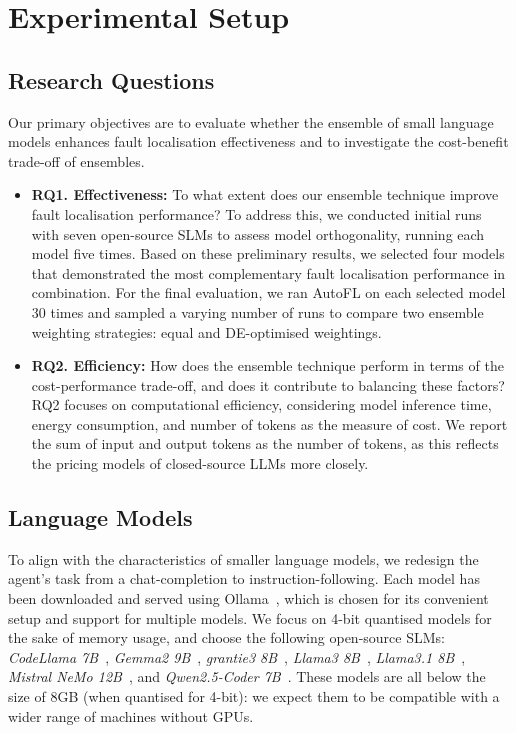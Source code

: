 \section{Experimental Setup}
\label{sec:experimentalsetup}

\subsection{Research Questions}
Our primary objectives are to evaluate whether the ensemble of small language models enhances fault localisation effectiveness and to investigate the cost-benefit trade-off of ensembles.

\begin{itemize}
    \item \textbf{RQ1. Effectiveness:} To what extent does our ensemble technique improve fault localisation performance? To address this, we conducted initial runs with seven open-source SLMs to assess model orthogonality, running each model five times. Based on these preliminary results, we selected four models that demonstrated the most complementary fault localisation performance in combination. For the final evaluation, we ran AutoFL on each selected model 30 times and sampled a varying number of runs to compare two ensemble weighting strategies: equal and DE-optimised weightings.
    
    \item \textbf{RQ2. Efficiency:} How does the ensemble technique perform in terms of the cost-performance trade-off, and does it contribute to balancing these factors? RQ2 focuses on computational efficiency, considering model inference time, energy consumption, and number of tokens as the measure of cost. We report the sum of input and output tokens as the number of tokens, as this reflects the pricing models of closed-source LLMs more closely.
\end{itemize}

\subsection{Language Models}

To align with the characteristics of smaller language models, we redesign the agent's task from a chat-completion to instruction-following. Each model has been downloaded and served using Ollama~\cite{Ollama2024}, which is chosen for its convenient setup and support for multiple models. We focus on 4-bit quantised models for the sake of memory usage, and choose the following open-source SLMs: \emph{CodeLlama 7B}~\cite{roziereCodeLlamaOpen2024}, \emph{Gemma2 9B}~\cite{teamGemma2Improving2024}, \emph{grantie3 8B}~\cite{Granite30Language2024}, \emph{Llama3 8B}~\cite{dubeyLlama3Herd2024}, \emph{Llama3.1 8B}~\cite{dubeyLlama3Herd2024}, \emph{Mistral NeMo 12B}~\cite{MistralNeMo2024}, and \emph{Qwen2.5-Coder 7B}~\cite{huiQwen25CoderTechnicalReport2024}. These models are all below the size of 8GB (when quantised for 4-bit): we expect them to be compatible with a wider range of machines without GPUs.

